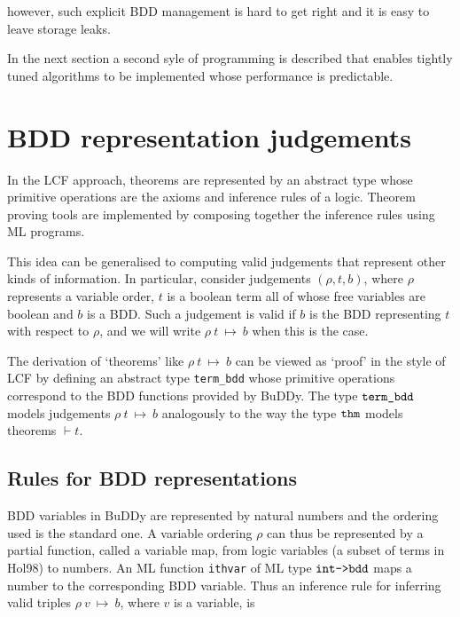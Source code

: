 \documentclass[12pt]{article}
\newcommand{\ty}[1]{\mbox{\tt #1}}
\newcommand{\ml}[1]{{\tt #1}}
\newcommand{\termbdd}[3]{\mbox{$#1~#2~\mapsto~#3$}}
\newcommand\termbddty{\ty{term\_bdd}}
\newcommand\Hol{Hol98\xspace}
\newcommand{\Buddy}{BuDDy\xspace}
\newcommand\fun{\mbox{\tt{->}}}
\begin{document}
\vspace*{-1mm}

\noindent however, such explicit BDD management is hard to get right
and it is easy to leave storage leaks.

In the next section a second syle of programming is described that
enables tightly tuned algorithms to be implemented whose performance is
predictable.

\vspace*{-2mm}

\section{BDD representation judgements}\label{second}

In the LCF approach, theorems are represented by an abstract type
whose primitive operations are the axioms and inference rules of a
logic.  Theorem proving tools are implemented by composing together
the inference rules using ML programs.

This idea can be generalised to computing valid judgements that
represent other kinds of information. In particular, 
consider judgements $(\rho,t,b)$, where $\rho$ represents a variable order, $t$ is a boolean term
all of whose free variables are boolean and $b$ is a BDD. Such a judgement
is valid if $b$ is the BDD representing $t$ with respect to $\rho$,
and we will write \termbdd{\rho}{t}{b} when this is the case.

The derivation of `theorems' like \termbdd{\rho}{t}{b} can be viewed
as `proof' in the style of LCF by defining an abstract type \termbddty{}
whose primitive operations correspond to the BDD functions provided by \Buddy.
The type $\termbddty$ models judgements $\termbdd{\rho}{t}{b}$ analogously
to the way the type $\ty{thm}$ models theorems $\vdash t$.


\vspace*{-3mm}

\subsection{Rules for BDD representations}\label{judgements}

BDD variables in \Buddy{} are represented by natural numbers and the
ordering used is the standard one. A variable ordering $\rho$ can thus
be represented by a partial function, called a variable map, from
logic variables (a subset of terms in \Hol{}) to numbers. An ML
function \ml{ithvar} of ML type $\ty{int}\fun\ty{bdd}$ maps a number to
the corresponding BDD variable.
Thus an inference rule for inferring valid triples
\termbdd{\rho}{v}{b}, where $v$ is a variable, is
\end{document}
